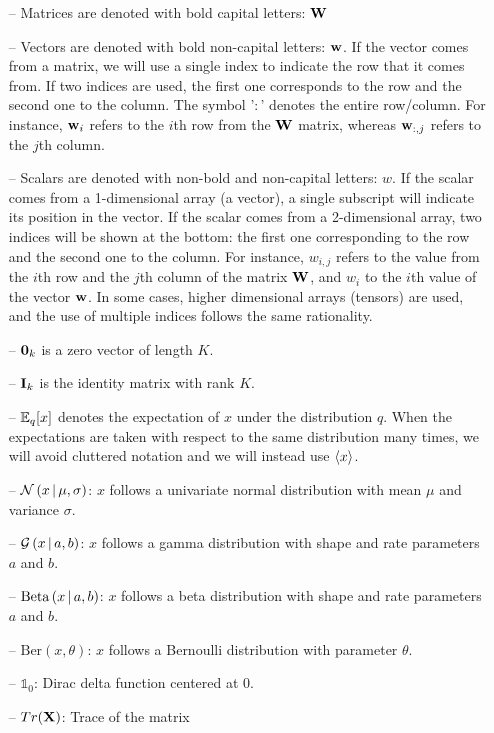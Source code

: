 \begin{itemize}[noitemsep]
	\item[--] Matrices are denoted with bold capital letters: ${\bf W}$
	\item[--] Vectors are denoted with bold non-capital letters: ${\bf w}$. If the vector comes from a matrix, we will use a single index to indicate the row that it comes from. If two indices are used, the first one corresponds to the row and the second one to the column. The symbol '$:$' denotes the entire row/column. For instance, ${\bf w}_{i}$ refers to the $i$th row from the ${\bf W}$ matrix, whereas ${\bf w}_{:,j}$ refers to the $j$th column.
	\item[--] Scalars are denoted with non-bold and non-capital letters: $w$. If the scalar comes from a 1-dimensional array (a vector), a single subscript will indicate its position in the vector. If the scalar comes from a 2-dimensional array, two indices will be shown at the bottom: the first one corresponding to the row and the second one to the column. For instance, $w_{i,j}$ refers to the value from the $i$th row and the $j$th column of the matrix ${\bf W}$, and $w_i$ to the $i$th value of the vector ${\bf w}$. In some cases, higher dimensional arrays (tensors) are used, and the use of multiple indices follows the same rationality.
	\item[--] ${\bf 0}_k$ is a zero vector of length $K$.
	\item[--] ${\bf I}_k$ is the identity matrix with rank $K$.
	\item[--] $\mathbb{E}_q[x]$ denotes the expectation of $x$ under the distribution $q$. When the expectations are taken with respect to the same distribution many times, we will avoid cluttered notation and we will instead use $\langle x \rangle$.
	\item[--] $\mathcal{N}\left(x \,|\, \mu,\sigma\right)$: $x$ follows a univariate normal distribution with mean $\mu$ and variance $\sigma$.
	\item[--] $\mathcal{G}\left(x \,|\, a,b\right)$: $x$ follows a gamma distribution with shape and rate parameters $a$ and $b$.
	\item[--] $\text{Beta}\left(x \,|\, a, b\right)$: $x$ follows a beta distribution with shape and rate parameters $a$ and $b$.
	\item[--] $\text{Ber}(x, \theta)$: $x$ follows a Bernoulli distribution with parameter $\theta$.
	\item[--] $\mathds{1}_0$: Dirac delta function centered at 0.
	\item[--] $Tr({\bf X})$: Trace of the matrix \bfX
\end{itemize}


